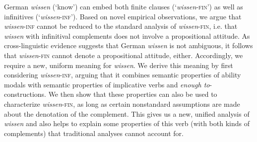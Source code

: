 German \textit{wissen} (‘know’) can embed both finite clauses (‘\textit{wissen}-\textsc{fin}’) as well as infinitives (‘\textit{wissen}-\textsc{inf}’). Based on novel empirical observations, we argue that \textit{wissen}-\textsc{inf} cannot be reduced to the standard analysis of \textit{wissen}-\textsc{fin}, i.e. that \textit{wissen} with infinitival complements does not involve a propositional attitude. As cross-linguistic evidence suggests that German \textit{wissen} is not ambiguous, it follows that \textit{wissen}-\textsc{fin} cannot denote a propositional attitude, either. Accordingly, we require a new, uniform meaning for \textit{wissen}. We derive this meaning by first considering \textit{wissen}-\textsc{inf}, arguing that it combines semantic properties of ability modals with semantic properties of implicative verbs and \textit{enough to}-constructions. We then show that these properties can also be used to characterize \textit{wissen}-\textsc{fin}, as long as certain nonstandard assumptions are made about the denotation of the complement. This gives us a new, unified analysis of \textit{wissen} and also helps to explain some properties of this verb (with both kinds of complements) that traditional analyses cannot account for.
\endinput